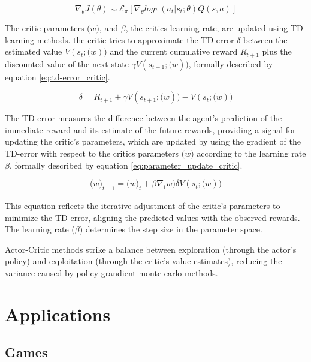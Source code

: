 \begin{equation}
    \label{eq:gradient_actor_critic}
    \nabla_\theta J(\theta) \eqsim \mathcal{E}_\pi[\nabla_\theta log \pi(a_t|s_t;\theta)Q(s,a)]
\end{equation}

The critic parameters $\mathcal(w)$, and $\beta$, the critics learning rate, are updated using TD learning methods. the critic tries to approximate the TD error $\delta$ between the estimated value $V(s_t;\mathcal(w))$ and the current cumulative reward $R_{t+1}$ plus the discounted value of the next state $\gamma V(s_{t+1};\mathcal(w))$, formally described by equation \ref{eq:td-error_critic}.

\begin{equation}
    \label{eq:td-error_critic}
    \delta = R_{t+1} + \gamma V(s_{t+1};\mathcal(w)) - V(s_t;\mathcal(w))
\end{equation}

The TD error measures the difference between the agent's prediction of the immediate reward and its estimate of the future rewards, providing a signal for updating the critic's parameters, which are updated by using the gradient of the TD-error with respect to the critics parameters $\mathcal(w)$ according to the learning rate $\beta$, formally described by equation \ref{eq:parameter_update_critic}.

\begin{equation}
    \label{eq:parameter_update_critic}
    \mathcal(w)_{t+1} = \mathcal(w)_t + \beta \nabla_\mathcal(w) \delta V(s_t;\mathcal(w))
\end{equation}

This equation reflects the iterative adjustment of the critic's parameters to minimize the TD error, aligning the predicted values with the observed rewards. The learning rate ($\beta$) determines the step size in the parameter space.

Actor-Critic methods strike a balance between exploration (through the actor's policy) and exploitation (through the critic's value estimates), reducing the variance caused by policy grandient monte-carlo methods.


\section{Applications}\label{sec:rl-applications}

\subsection*{Games}

